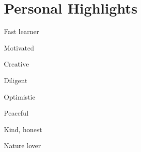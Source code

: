 
\section{Personal Highlights}

    \multicolentry{*, *, *, *}
    {
        \begin{highlightsforbulletentries}
            \item Fast learner \hspace{0.1cm} 
            \item Motivated \hspace{0.1cm} 
        \end{highlightsforbulletentries}
    }
    {
        \begin{highlightsforbulletentries}
            \item Creative \hspace{0.1cm} 
            \item Diligent \hspace{0.1cm} 
        \end{highlightsforbulletentries}
    }
    {
        \begin{highlightsforbulletentries}
            \item Optimistic \hspace{0.1cm} 
            \item Peaceful \hspace{0.1cm} 
        \end{highlightsforbulletentries}
    }
    {
        \begin{highlightsforbulletentries}
            \item Kind, honest \hspace{0.1cm} 
            \item Nature lover \hspace{0.1cm} 
        \end{highlightsforbulletentries}
    }
